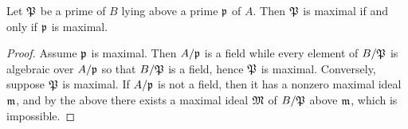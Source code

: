 \begin{proposition}
  Let $\mathfrak{P}$ be a prime of $B$ lying above a prime $\mathfrak{p}$ of $A$.
  Then $\mathfrak{P}$ is maximal if and only if $\mathfrak{p}$ is maximal.
\end{proposition}
\begin{proof}
  Assume $\mathfrak{p}$ is maximal.
  Then $A/\mathfrak{p}$ is a field while every element of $B/\mathfrak{P}$ is algebraic over $A/\mathfrak{p}$ so that $B/\mathfrak{P}$ is a field, hence $\mathfrak{P}$ is maximal.
  Conversely, suppose $\mathfrak{P}$ is maximal.
  If $A/\mathfrak{p}$ is not a field, then it has a nonzero maximal ideal $\mathfrak{m}$, and by the above there exists a maximal ideal $\mathfrak{M}$ of $B/\mathfrak{P}$ above $\mathfrak{m}$, which is impossible.
\end{proof}


